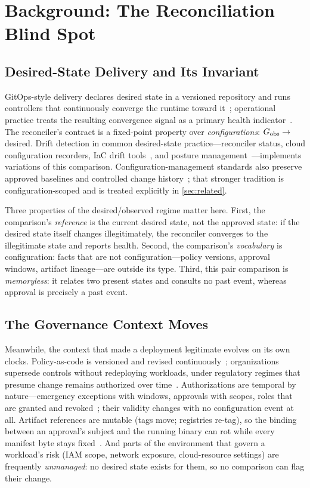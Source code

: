 \section{Background: The Reconciliation Blind Spot}
\label{sec:background}

\subsection{Desired-State Delivery and Its Invariant}
GitOps-style delivery declares desired state in a versioned repository and
runs controllers that continuously converge the runtime toward
it~\cite{opengitops,beetz2022,argocd,fluxcd}; operational practice treats the
resulting convergence signal as a primary health indicator~\cite{beyer2016}. The reconciler's contract is a
fixed-point property over \emph{configurations}: $G_{\mathrm{obs}} \to$ desired. Drift
detection in common desired-state practice---reconciler status, cloud
configuration recorders, IaC drift tools~\cite{awsconfig,driftctl}, and
posture management~\cite{cspm}---implements variations of this comparison.
Configuration-management standards also preserve approved baselines and
controlled change history~\cite{nist800128,nist80053}; that stronger tradition
is configuration-scoped and is treated explicitly in \cref{sec:related}.

Three properties of the desired/observed regime matter here. First, the comparison's
\emph{reference} is the current desired state, not the approved state: if the
desired state itself changes illegitimately, the reconciler converges to the
illegitimate state and reports health. Second, the comparison's
\emph{vocabulary} is configuration: facts that are not configuration---policy
versions, approval windows, artifact lineage---are outside its type. Third,
this pair comparison is \emph{memoryless}: it relates two present states and
consults no past event, whereas approval is precisely a past event.

\subsection{The Governance Context Moves}
Meanwhile, the context that made a deployment legitimate evolves on its own
clocks. Policy-as-code is versioned and revised
continuously~\cite{opa,kyverno}; organizations supersede controls without
redeploying workloads, under regulatory regimes that presume change remains
authorized over time~\cite{sox2002,nist80053}. Authorizations are temporal by nature---emergency
exceptions with windows, approvals with scopes, roles that are granted and
revoked~\cite{sandhu1996,itil4}; their validity changes with no configuration
event at all. Artifact references are mutable (tags move; registries re-tag),
so the binding between an approval's subject and the running binary can rot
while every manifest byte stays fixed~\cite{slsa,torres2019}. And parts of the
environment that govern a workload's risk (IAM scope, network exposure,
cloud-resource settings) are frequently \emph{unmanaged}: no desired state
exists for them, so no comparison can flag their change.

